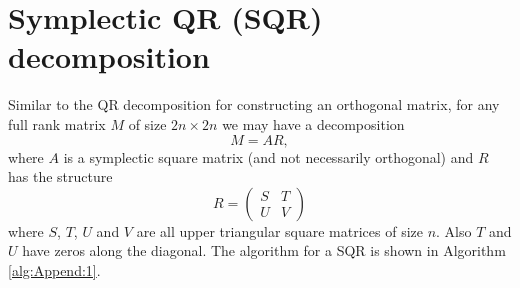 \section{Symplectic QR (SQR) decomposition} \label{chap:Append:1}

Similar to the QR decomposition for constructing an orthogonal matrix, for any full rank matrix $M$ of size $2n\times 2n$ we may have a decomposition
\begin{equation}
	M = AR,
\end{equation}
where $A$ is a symplectic square matrix (and not necessarily orthogonal) and $R$ has the structure
\begin{equation}
	R =
	\begin{pmatrix}
		S & T \\
		U & V
	\end{pmatrix}
\end{equation}
where $S$, $T$, $U$ and $V$ are all upper triangular square matrices of size $n$. Also $T$ and $U$ have zeros along the diagonal. The algorithm for a SQR is shown in Algorithm \ref{alg:Append:1}.

